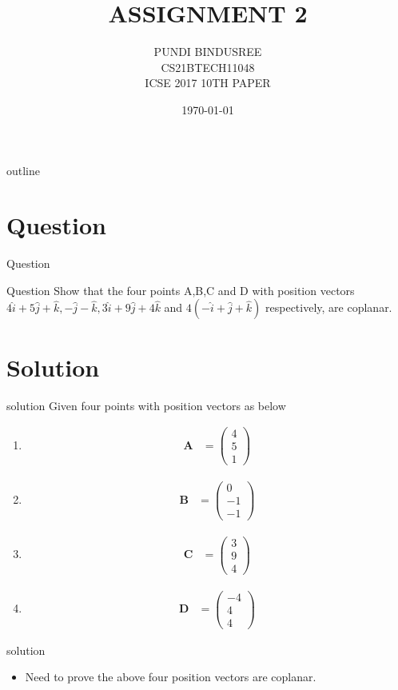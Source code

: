\documentclass{beamer}
\title{ASSIGNMENT 2}
\author{PUNDI BINDUSREE \\ CS21BTECH11048\\ ICSE 2017 10TH PAPER}
\date{\today}
\let\vec\mathbf
\newcommand{\myvec}[1]{\ensuremath{\begin{pmatrix}#1\end{pmatrix}}}
\begin{document}
\begin{frame}
\titlepage
\end{frame}

\logo{}
\begin{frame}{outline}
\tableofcontents
\end{frame}

\section{Question}
\begin{frame}{Question}
\begin{block}{Question}
Show that the four points A,B,C and D with position vectors $4\hat{i}+5\hat{j}+\hat{k},-\hat{j}-\hat{k},3\hat{i}+9\hat{j}+4\hat{k}$ and $4(-\hat{i}+\hat{j}+\hat{k})$ respectively, are coplanar.
\end{block}
\end{frame}


\section{Solution}
\begin{frame}{solution}
 Given four points with position vectors as below
\begin{enumerate}
     \item \begin{align}\vec{A} & =\myvec{4\\5\\1}\end{align}
     \item \begin{align}\vec{B} & =\myvec{0\\-1\\-1}\end{align}     
     \item \begin{align}\vec{C} & =\myvec{3\\9\\4}\end{align}     
     \item \begin{align}\vec{D} & =\myvec{-4\\4\\4}\end{align}
\end{enumerate}
\end{frame}
 
\begin{frame}{solution}
\begin{itemize}
    \item Need to prove the above four position vectors are coplanar.
\end{itemize}
\end{frame}
 
\end{document}

